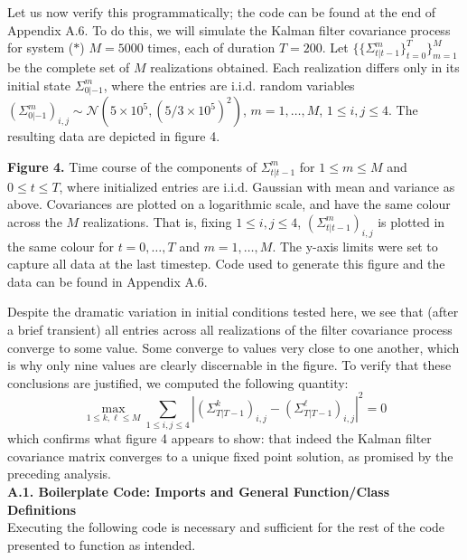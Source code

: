 \documentclass[10pt]{article}
\newcommand{\1}[1]{\mathbbm{1}_{#1}}
\newcommand{\mc}[1]{\mathcal{#1}}
\begin{document}
    Let us now verify this programmatically; the code can be found at the end of Appendix A.6. To do this, we will simulate the Kalman filter covariance process for system ($\ast$) $M=5000$ times, each of duration $T=200$. Let $\{\{\Sigma^m_{t|t-1}\}_{t=0}^{T}\}_{m=1}^{M}$ be the complete set of $M$ realizations obtained. Each realization differs only in its initial state $\Sigma^m_{0|-1}$, where
    the entries are i.i.d. random variables $(\Sigma^m_{0|-1})_{i,j}\sim\mc{N}(5\times10^5, (5/3\times 10^5)^2)$, $m=1,\dots, M$, $1\leq i,j\leq 4$. The resulting data are depicted in figure 4.
    \begin{center}
    \end{center}
    \begin{center}
        \begin{minipage}{\dimexpr\paperwidth-5cm}
            {\bf Figure 4.} Time course of the components of $\Sigma^m_{t|t-1}$ for $1\leq m\leq M$ and $0\leq t\leq T$, where initialized entries are  i.i.d. Gaussian with mean and variance as above. Covariances are plotted on a logarithmic scale,
            and have the same colour across the $M$ realizations. That is, fixing $1\leq i,j\leq 4$, $(\Sigma_{t|t-1}^m)_{i,j}$ is plotted in the same colour for $t=0,\dots,T $ and $m=1,\dots, M$. The y-axis limits were set to capture all data at the last timestep.
            Code used to generate this figure and the data can be found in Appendix A.6.
        \end{minipage}
    \end{center}
    Despite the dramatic variation in initial conditions tested here, we see that (after a brief transient) all entries across all realizations of the filter covariance process converge to some value. Some converge to values very close to one another, which is why only nine
    values are clearly discernable in the figure. To verify that these conclusions are justified, we computed the following quantity:
    \[\max_{1\leq k,\ell\leq M}\sum_{1\leq i,j\leq 4}\left|(\Sigma^k_{T|T-1})_{i,j}-(\Sigma^\ell_{T|T-1})_{i,j}\right|^2=0\]
    which confirms what figure 4 appears to show: that indeed the Kalman filter covariance matrix converges to a unique fixed point solution, as promised by the preceding analysis.
    \newpage
    \\[10pt]
    {\bf A.1. Boilerplate Code: Imports and General Function/Class Definitions}\\[5pt]
    Executing the following code is necessary and sufficient for the rest of the code presented to function as intended.
\end{document}
